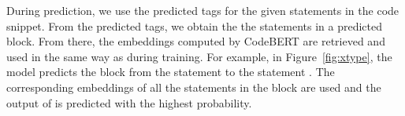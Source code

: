 During prediction, we use the predicted tags for the given statements
in the code snippet. From the predicted tags, we obtain the the
statements in a predicted  block. From there, the
embeddings computed by CodeBERT are retrieved and used in the same way
as during training. For example, in Figure~\ref{fig:xtype}, the model
predicts the  block from the statement
 to the statement . The
corresponding embeddings of all the statements in the block are used
and the output of  is predicted with the highest
probability.








%
%
